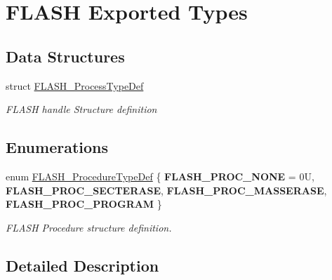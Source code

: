 \hypertarget{group___f_l_a_s_h___exported___types}{}\section{F\+L\+A\+SH Exported Types}
\label{group___f_l_a_s_h___exported___types}
\subsection*{Data Structures}
\begin{DoxyCompactItemize}
\item 
struct \mbox{\hyperlink{struct_f_l_a_s_h___process_type_def}{F\+L\+A\+S\+H\+\_\+\+Process\+Type\+Def}}
\begin{DoxyCompactList}\small\item\em F\+L\+A\+SH handle Structure definition ~\newline
 \end{DoxyCompactList}\end{DoxyCompactItemize}
\subsection*{Enumerations}
\begin{DoxyCompactItemize}
\item 
\mbox{\label{group___f_l_a_s_h___exported___types_ga2b0268387bc11bcab76be9ce7c43eaaf}} 
enum \mbox{\hyperlink{group___f_l_a_s_h___exported___types_ga2b0268387bc11bcab76be9ce7c43eaaf}{F\+L\+A\+S\+H\+\_\+\+Procedure\+Type\+Def}} \{ {\bfseries F\+L\+A\+S\+H\+\_\+\+P\+R\+O\+C\+\_\+\+N\+O\+NE} = 0U, 
{\bfseries F\+L\+A\+S\+H\+\_\+\+P\+R\+O\+C\+\_\+\+S\+E\+C\+T\+E\+R\+A\+SE}, 
{\bfseries F\+L\+A\+S\+H\+\_\+\+P\+R\+O\+C\+\_\+\+M\+A\+S\+S\+E\+R\+A\+SE}, 
{\bfseries F\+L\+A\+S\+H\+\_\+\+P\+R\+O\+C\+\_\+\+P\+R\+O\+G\+R\+AM}
 \}
\begin{DoxyCompactList}\small\item\em F\+L\+A\+SH Procedure structure definition. \end{DoxyCompactList}\end{DoxyCompactItemize}


\subsection{Detailed Description}
